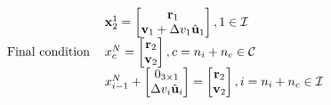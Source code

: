 \begin{align}
\begin{tabular}{cl}
                                & \(\x_2^1 = \begin{bmatrix}
                                    \mathbf{r}_1 \\ \mathbf{v}_1 + \Delta v_1 \hat{\mathbf{u}}_1
                                \end{bmatrix}, 1 \in \mathcal{I}\) \\
    Final condition             & \(x_c^N = \begin{bmatrix}
        \mathbf{r}_2 \\ \mathbf{v}_2
    \end{bmatrix}, c = n_i+n_c \in \mathcal{C}\) \\
                                & \(x_{i-1}^N + \begin{bmatrix}
                                    0_{3\times1} \\ \Delta v_i \hat{\mathbf{u}}_i
                                \end{bmatrix} = \begin{bmatrix}
                                    \mathbf{r}_2 \\ \mathbf{v}_2
                                \end{bmatrix}, i = n_i+n_c \in \mathcal{I}\)
    \end{tabular}
 \end{align}


